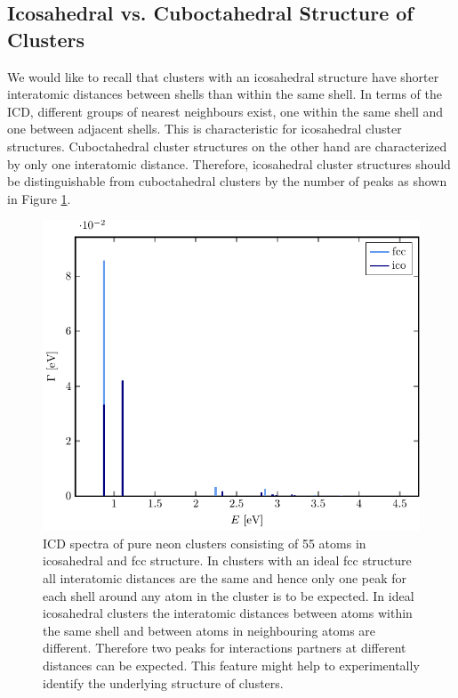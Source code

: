 \subsection{Icosahedral vs. Cuboctahedral Structure of Clusters}
\label{sec:icofcc}
We would like to recall that clusters with an icosahedral structure
have shorter interatomic distances between shells than within the same
shell.
In terms of the ICD, different groups of nearest neighbours exist,
one within the same shell and one
between adjacent shells. This is characteristic for icosahedral cluster structures.
Cuboctahedral cluster structures on the other hand are characterized by only
one interatomic distance. 
Therefore, icosahedral cluster structures should be distinguishable from
cuboctahedral clusters by the number of peaks as shown in Figure
\ref{figure:reinNe}.

\begin{figure}[h]
 \centering
 \includegraphics[width=\columnwidth]{pics/reinNe}
 \caption{ICD spectra of pure neon clusters consisting of 55 atoms in
          icosahedral and fcc structure. In clusters with an ideal fcc structure
          all interatomic distances are the same and hence only one peak
          for each shell around any atom in the cluster is to be expected.
          In ideal icosahedral clusters the interatomic distances between atoms
          within the same shell and between atoms in neighbouring atoms
          are different. Therefore two peaks for interactions partners
          at different distances can be expected. This feature might
          help to experimentally identify the underlying structure of clusters.}
 \label{figure:reinNe}
\end{figure}

